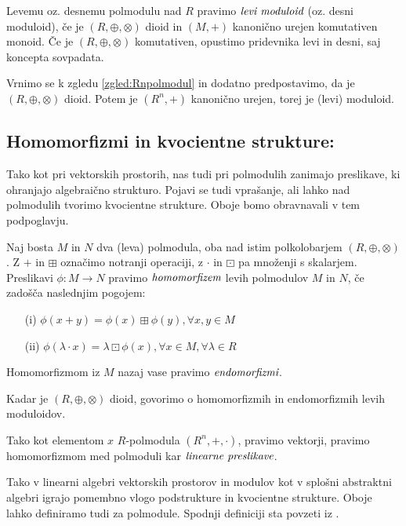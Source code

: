 \documentclass[mat1]{fmfdelo}
\newcommand{\pojem}[1]{\ensuremath{\emph{#1}}}
\newcommand{\map}[3]{\ensuremath{{#1}:{#2}\rightarrow{#3}}}
\begin{document}
\begin{definicija}
	Levemu oz. desnemu polmodulu nad $R$ pravimo \pojem{levi~moduloid} (oz. desni moduloid), če je $(R, \oplus, \otimes)$ dioid in $(M, +)$ kanonično urejen komutativen monoid. Če je $(R, \oplus, \otimes)$ komutativen, opustimo pridevnika levi in desni, saj koncepta sovpadata.
\end{definicija}

\begin{zgled}
	Vrnimo se k zgledu \ref{zgled:Rnpolmodul} in dodatno predpostavimo, da je $(R, \oplus, \otimes)$ dioid. Potem je $(R^n, +)$ kanonično urejen, torej je (levi) moduloid.
\end{zgled}

\subsection{Homomorfizmi in kvocientne strukture:} Tako kot pri vektorskih prostorih, nas tudi pri polmodulih zanimajo preslikave, ki ohranjajo algebraično strukturo. Pojavi se tudi vprašanje, ali lahko nad polmodulih tvorimo kvocientne strukture. Oboje bomo obravnavali v tem podpoglavju.

\begin{definicija}
	Naj bosta $M$ in $N$ dva (leva) polmodula, oba nad istim polkolobarjem $(R, \oplus, \otimes)$. Z $+$ in $\boxplus$ označimo notranji operaciji, z $\cdot$ in $\boxdot$ pa množenji s skalarjem. Preslikavi \map{\phi}{M}{N} pravimo \pojem{homomorfizem} levih polmodulov $M$ in $N$, če zadošča naslednjim pogojem: \begin{enumerate}
		\item[(i)] $\phi(x + y) = \phi(x)\boxplus\phi(y), \forall x, y\in M$
		\item[(ii)] $\phi(\lambda\cdot x) = \lambda \boxdot \phi(x), \forall x\in M, \forall \lambda\in R$
	\end{enumerate}
Homomorfizmom iz $M$ nazaj vase pravimo \pojem{endomorfizmi}.

Kadar je $(R, \oplus, \otimes)$ dioid, govorimo o homomorfizmih in endomorfizmih levih moduloidov.
\end{definicija}

\begin{opomba}
	Tako kot elementom $x$ $R$-polmodula $(R^n, +, \cdot)$, pravimo vektorji, pravimo homomorfizmom med polmoduli kar \pojem{linearne preslikave}.
\end{opomba}

Tako v linearni algebri vektorskih prostorov in modulov kot v splošni abstraktni algebri igrajo pomembno vlogo podstrukture in kvocientne strukture. Oboje lahko definiramo tudi za polmodule. Spodnji definiciji sta povzeti iz \cite{bib:Gondran}.
\end{document}
